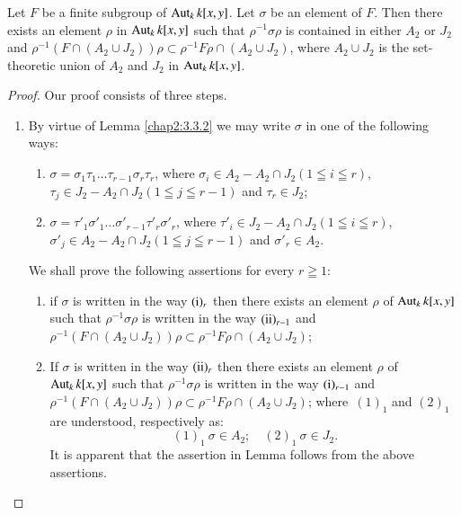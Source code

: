 \subsubsection{}\label{chap2:3.5.3}
\begin{lemma*}
  Let $F$ be a finite subgroup of $\operatorname{Aut}_{k}k[x,y]$. Let $\sigma$ be an
  element of $F$. Then there exists an element $\rho$ in
  $\operatorname{Aut}_{k}k[x,y]$ such that $\rho^{-1}\sigma\rho$ is contained in
  either $A_{2}$ or $J_{2}$ and $\rho^{-1}(F\cap (A_{2}\cup
  J_{2}))\rho\subset \rho^{-1}F\rho\cap (A_{2}\cup J_{2})$, where
  $A_{2}\cup J_{2}$ is the set-theoretic union of $A_{2}$ and $J_{2}$ in
  $\operatorname{Aut}_{k}k[x,y]$. 
\end{lemma*}

\begin{proof}
Our proof consists of three steps.
\begin{enumerate}
\renewcommand{\theenumi}{\Roman{enumi}}
\renewcommand{\labelenumi}{(\theenumi)}
\item By virtue of Lemma \ref{chap2:3.3.2} we may write $\sigma$ in one
  of the following ways:
\begin{enumerate}
\renewcommand{\theenumii}{\roman{enumii}}
\renewcommand{\labelenumii}{\rm(\theenumii)$_{r}$}
\item $\sigma=\sigma_{1}\tau_{1}\ldots\tau_{r-1}\sigma_{r}\tau_{r}$,
  where $\sigma_{i}\in A_{2}-A_{2}\cap J_{2}(1\leqq i\leqq r)$,
  $\tau_{j}\in J_{2}-A_{2}\cap J_{2} (1\leqq j\leqq r-1)$ and
  $\tau_{r}\in J_{2}$;

\item
  $\sigma=\tau'_{1}\sigma'_{1}\ldots\sigma'_{r-1}\tau'_{r}\sigma'_{r}$,
  where $\tau'_{i}\in J_{2}-A_{2}\cap J_{2}(1\leqq i\leqq r)$,
  $\sigma'_{j}\in A_{2}-A_{2}\cap J_{2}(1\leqq j\leqq r-1)$ and
  $\sigma'_{r}\in A_{2}$. 
\end{enumerate}
We shall prove the following assertions for every $r\geqq 1$:
\begin{enumerate}
\renewcommand{\theenumii}{\arabic{enumii}}
\renewcommand{\labelenumii}{\rm(\theenumii)$_{r}$}
\item if $\sigma$ is written in the way $({\rm i})_{r}$ then there
  exists an element $\rho$ of $\operatorname{Aut}_{k}k[x,y]$ such that
  $\rho^{-1}\sigma\rho$ is written in the way $({\rm ii})_{r-1}$ and
  $\rho^{-1}(F\cap (A_{2}\cup J_{2}))\rho\subset \rho^{-1}F\rho\cap
  (A_{2}\cup J_{2})$;

\item If $\sigma$ is written in the way $({\rm ii})_{r}$ then there
  exists an element $\rho$ of $\operatorname{Aut}_{k}k[x,y]$ such that
  $\rho^{-1}\sigma\rho$ is written in the way $({\rm i})_{r-1}$ and
  $\rho^{-1}(F\cap (A_{2}\cup J_{2}))\rho\subset \rho^{-1}F\rho\cap
  (A_{2}\cup J_{2})$; where\pageoriginale\ $(1)_{1}$ and $(2)_{1}$ are
  understood, respectively as:
$$
(1)_{1}~\sigma\in A_{2};\quad (2)_{1}~\sigma\in J_{2}.
$$
It is apparent that the assertion in Lemma follows from the above
assertions. 
\end{enumerate}


\end{enumerate}
\end{proof}

